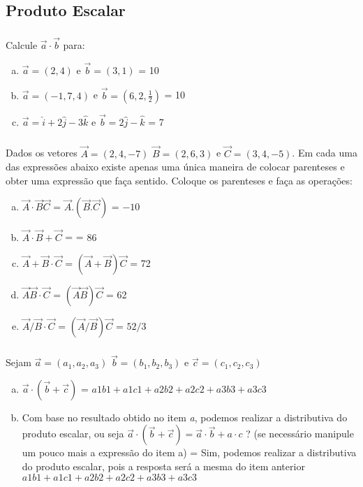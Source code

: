 \documentclass[a4paper,10pt]{article}
\begin{document}
\subsection{Produto Escalar}

\subsubsection{}Calcule $\vec{a} \cdot \vec{b}$ para:

\begin{enumerate}[a)]
 \item $\vec{a}=(2,4)$ e $\vec{b}=(3,1)$ = 
 10
 \item $\vec{a}=(-1,7,4)$ e $\vec{b}=(6,2,\frac{1}{2})$ = 
 10
 \item $\vec{a}= \hat{i} + 2\hat{j} - 3\hat{k}$ e $\vec{b}= 2\hat{j} - \hat{k}$ =
 7
\end{enumerate}


\subsubsection{}Dados os vetores $\vec{A}=(2,4,-7)$ $\vec{B}=(2,6,3)$ e $\vec{C}=(3,4,-5)$. 
Em cada uma das expressões abaixo existe apenas uma única maneira de colocar parenteses e obter uma
expressão que faça sentido. Coloque os parenteses e faça as operações: 


\begin{enumerate}[a)]
 \item $ \vec{A} \cdot \vec{B}       \vec{C}$ = 
 $\vec{A}.(\vec{B}.\vec{C})$ = $-10$
 
 \item $ \vec{A} \cdot \vec{B} +     \vec{C}$ = 
 = $86$
 \item $ \vec{A} +     \vec{B} \cdot \vec{C}$ =
 $(\vec{A}+\vec{B})\vec{C}$ = 72
 \item $ \vec{A}       \vec{B} \cdot \vec{C}$ =
 $(\vec{A}\vec{B})\vec{C}$ = 62
 \item $ \vec{A} /     \vec{B} \cdot \vec{C}$ =
 $(\vec{A} / \vec{B})\vec{C}$  = $52 / 3$
\end{enumerate}

\subsubsection{}Sejam $\vec{a} = (a_1,a_2,a_3)$ $\vec{b} = (b_1,b_2,b_3)$ e $\vec{c} = (c_1,c_2,c_3)$ 

\begin{enumerate}[a)]
 \item $ \vec{a} \cdot (\vec{b}  +   \vec{c})$ = 
 $a1b1 + a1c1 + a2b2 + a2c2 + a3b3 + a3c3$

 \item  Com base no resultado obtido no item \textit{a}, podemos realizar a distributiva do produto escalar, ou seja
 $ \vec{a} \cdot (\vec{b}  +   \vec{c}) = \vec{a} \cdot \vec{b} + a \cdot c $ ? (se necessário manipule um pouco mais a expressão do item a) = 
 Sim, podemos realizar a distributiva do produto escalar, pois a resposta será a mesma do item anterior $a1b1 + a1c1 + a2b2 + a2c2 + a3b3 + a3c3$
\end{enumerate}
\end{document}

